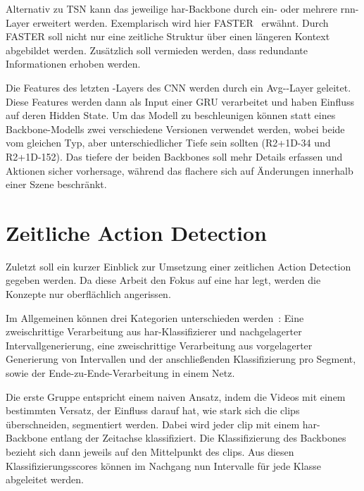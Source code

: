 Alternativ zu TSN kann das jeweilige \gls{har}-Backbone durch ein- oder mehrere \gls{rnn}-Layer erweitert werden.
Exemplarisch wird hier FASTER~\cite{Zhu19} erwähnt.
Durch FASTER soll nicht nur eine zeitliche Struktur über einen längeren Kontext abgebildet werden.
Zusätzlich soll vermieden werden, dass redundante Informationen erhoben werden.

Die Features des letzten \conv-Layers des CNN werden durch ein Avg-\pool-Layer geleitet.
Diese Features werden dann als Input einer GRU verarbeitet und haben Einfluss auf deren Hidden State.
Um das Modell zu beschleunigen können statt eines Backbone-Modells zwei verschiedene Versionen verwendet werden, wobei beide vom gleichen Typ, aber unterschiedlicher Tiefe sein sollten (\zB R2+1D-34 und R2+1D-152).
Das tiefere der beiden Backbones soll mehr Details erfassen und Aktionen sicher vorhersage, während das flachere sich auf Änderungen innerhalb einer Szene beschränkt.

\section{Zeitliche Action Detection}
\label{sec:temporal-action-detection}

Zuletzt soll ein kurzer Einblick zur Umsetzung einer zeitlichen Action Detection gegeben werden.
Da diese Arbeit den Fokus auf eine \gls{har} legt, werden die Konzepte nur oberflächlich angerissen.

Im Allgemeinen können drei Kategorien unterschieden werden~\cite{Buch17}:
Eine zweischrittige Verarbeitung aus \gls{har}-Klassifizierer und nachgelagerter Intervallgenerierung, eine zweischrittige Verarbeitung aus vorgelagerter Generierung von Intervallen und der anschließenden Klassifizierung pro Segment, sowie der Ende-zu-Ende-Verarbeitung in einem Netz.

Die erste Gruppe entspricht einem naiven Ansatz, indem die Videos mit einem bestimmten Versatz, der Einfluss darauf hat, wie stark sich die \glspl{clip} überschneiden, segmentiert werden.
Dabei wird jeder \gls{clip} mit einem \gls{har}-Backbone entlang der Zeitachse klassifiziert.
Die Klassifizierung des Backbones bezieht sich dann jeweils auf den Mittelpunkt des \glspl{clip}.
Aus diesen Klassifizierungsscores können im Nachgang nun Intervalle für jede Klasse abgeleitet werden.


